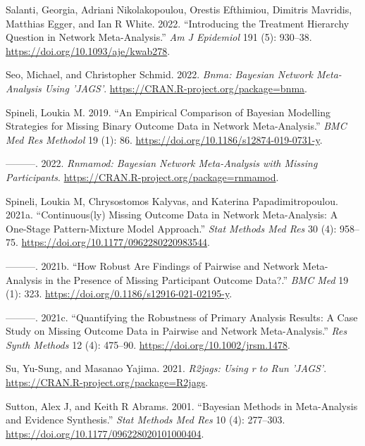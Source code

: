 \begin{CSLReferences}{1}{0}
\leavevmode{}%
Salanti, Georgia, Adriani Nikolakopoulou, Orestis Efthimiou, Dimitris Mavridis, Matthias Egger, and Ian R White. 2022. {``Introducing the Treatment Hierarchy Question in Network Meta-Analysis.''} \emph{Am J Epidemiol} 191 (5): 930--38. \url{https://doi.org/10.1093/aje/kwab278}.

\leavevmode{}%
Seo, Michael, and Christopher Schmid. 2022. \emph{Bnma: Bayesian Network Meta-Analysis Using 'JAGS'}. \url{https://CRAN.R-project.org/package=bnma}.

\leavevmode{}%
Spineli, Loukia M. 2019. {``An Empirical Comparison of Bayesian Modelling Strategies for Missing Binary Outcome Data in Network Meta-Analysis.''} \emph{BMC Med Res Methodol} 19 (1): 86. \url{https://doi.org/10.1186/s12874-019-0731-y}.

\leavevmode{}%
---------. 2022. \emph{Rnmamod: Bayesian Network Meta-Analysis with Missing Participants}. \url{https://CRAN.R-project.org/package=rnmamod}.

\leavevmode{}%
Spineli, Loukia M, Chrysostomos Kalyvas, and Katerina Papadimitropoulou. 2021a. {``Continuous(ly) Missing Outcome Data in Network Meta-Analysis: A One-Stage Pattern-Mixture Model Approach.''} \emph{Stat Methods Med Res} 30 (4): 958--75. \url{https://doi.org/10.1177/0962280220983544}.

\leavevmode{}%
---------. 2021b. {``How Robust Are Findings of Pairwise and Network Meta-Analysis in the Presence of Missing Participant Outcome Data?.''} \emph{BMC Med} 19 (1): 323. \url{https://doi.org/0.1186/s12916-021-02195-y}.

\leavevmode{}%
---------. 2021c. {``Quantifying the Robustness of Primary Analysis Results: A Case Study on Missing Outcome Data in Pairwise and Network Meta-Analysis.''} \emph{Res Synth Methods} 12 (4): 475--90. \url{https://doi.org/10.1002/jrsm.1478}.

\leavevmode{}%
Su, Yu-Sung, and Masanao Yajima. 2021. \emph{R2jags: Using r to Run 'JAGS'}. \url{https://CRAN.R-project.org/package=R2jags}.

\leavevmode{}%
Sutton, Alex J, and Keith R Abrams. 2001. {``Bayesian Methods in Meta-Analysis and Evidence Synthesis.''} \emph{Stat Methods Med Res} 10 (4): 277--303. \url{https://doi.org/10.1177/096228020101000404}.


\end{CSLReferences}
